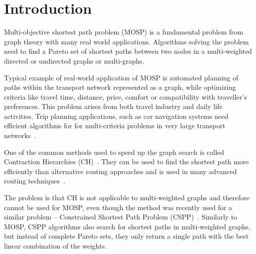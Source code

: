 % 
%  
%  
%  

\section{Introduction}
\label{secIntroduction}

Multi-objective shortest path problem (MOSP) is a fundamental problem from graph theory with many real world applications. Algorithms solving the problem need to find a Pareto set of shortest paths between two nodes in a multi-weighted directed or undirected graphs or multi-graphs. 

Typical example of real-world application of MOSP is automated planning of paths within the transport network represented as a graph, while optimizing criteria like travel time, distance, price, comfort or compatibility with traveller's preferences. This problem arises from both travel industry and daily life activities. Trip planning applications, such as car navigation systems need efficient algorithms for for multi-criteria problems in very large transport networks~\cite{veneti2016time}. 



One of the common methods used to speed up the graph search is called Contraction Hierarchies (CH)~\cite{geisberger2008contraction}. They can be used to find the shortest path more efficiently than  alternative routing approaches and is used in many advanced routing techniques~\cite{delling2009engineering}. 

The problem is that CH is not applicable to multi-weighted graphs and therefore cannot be used for MOSP, even though the method was recently used for a similar problem -- Constrained Shortest Path Problem (CSPP)~\cite{pugliese2013survey,funke2013polynomial}. Similarly to MOSP, CSPP algorithms also search for shortest paths in multi-weighted graphs, but instead of complete Pareto sets, they only return a single path with the best linear combination of the weights.  

